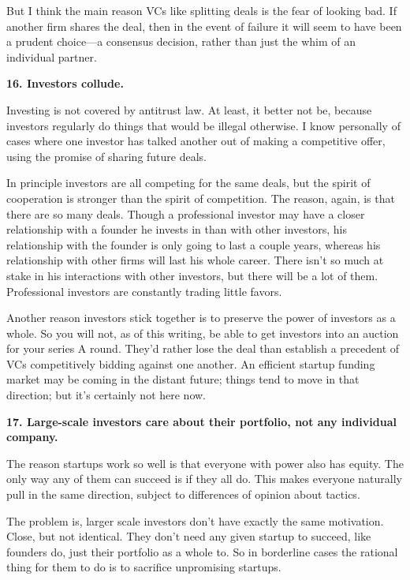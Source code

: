 \documentclass[12pt]{book}
\begin{document}
But I think the main reason VCs like splitting deals is the fear of
looking bad. If another firm shares the deal, then in the event of
failure it will seem to have been a prudent choice---a consensus
decision, rather than just the whim of an individual partner.

\textbf{16. Investors collude.}

Investing is not covered by antitrust law. At least, it better not be,
because investors regularly do things that would be illegal otherwise. I
know personally of cases where one investor has talked another out of
making a competitive offer, using the promise of sharing future deals.

In principle investors are all competing for the same deals, but the
spirit of cooperation is stronger than the spirit of competition. The
reason, again, is that there are so many deals. Though a professional
investor may have a closer relationship with a founder he invests in
than with other investors, his relationship with the founder is only
going to last a couple years, whereas his relationship with other firms
will last his whole career. There isn't so much at stake in his
interactions with other investors, but there will be a lot of them.
Professional investors are constantly trading little favors.

Another reason investors stick together is to preserve the power of
investors as a whole. So you will not, as of this writing, be able to
get investors into an auction for your series A round. They'd rather
lose the deal than establish a precedent of VCs competitively bidding
against one another. An efficient startup funding market may be coming
in the distant future; things tend to move in that direction; but it's
certainly not here now.

\textbf{17. Large-scale investors care about their portfolio, not any
individual company.}

The reason startups work so well is that everyone with power also has
equity. The only way any of them can succeed is if they all do. This
makes everyone naturally pull in the same direction, subject to
differences of opinion about tactics.

The problem is, larger scale investors don't have exactly the same
motivation. Close, but not identical. They don't need any given startup
to succeed, like founders do, just their portfolio as a whole to. So in
borderline cases the rational thing for them to do is to sacrifice
unpromising startups.
\end{document}
